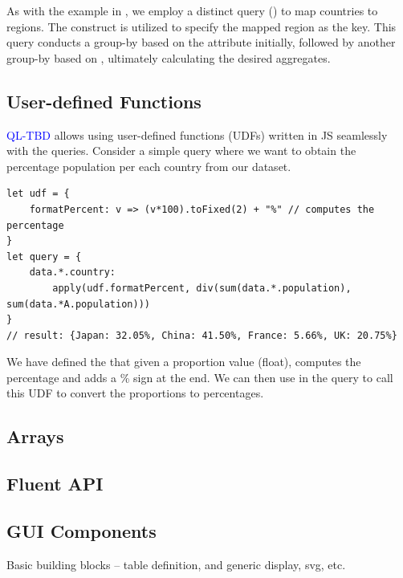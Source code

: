 \documentclass[runningheads]{llncs}
\newcommand{\lang}{\textcolor{blue}{QL-TBD}}
\begin{document}
As with the example in , we employ a distinct query
() to map countries to regions.
The  construct is utilized to specify the mapped region
as the key.
This query conducts a group-by based on the  attribute initially,
followed by another group-by based on , ultimately calculating the
desired aggregates.

\subsection{User-defined Functions}
\lang{} allows using user-defined functions (UDFs) written in JS seamlessly with the
queries.
Consider a simple query where we want to obtain the percentage population per each
country from our dataset.

\begin{lstlisting}[style=JavaScript, columns=flexible]
let udf = {
    formatPercent: v => (v*100).toFixed(2) + "%" // computes the percentage 
}
let query = {
    data.*.country:
        apply(udf.formatPercent, div(sum(data.*.population), sum(data.*A.population)))
}
// result: {Japan: 32.05%, China: 41.50%, France: 5.66%, UK: 20.75%}
\end{lstlisting}

We have defined the  that given a proportion value (float),
computes the percentage and adds a \% sign at the end.
We can then use  in the query to call this UDF to convert the
proportions to percentages.


\subsection{Arrays}

\subsection{Fluent API}

\subsection{GUI Components}
Basic building blocks -- table definition, and generic display, svg, etc. 
\end{document}
